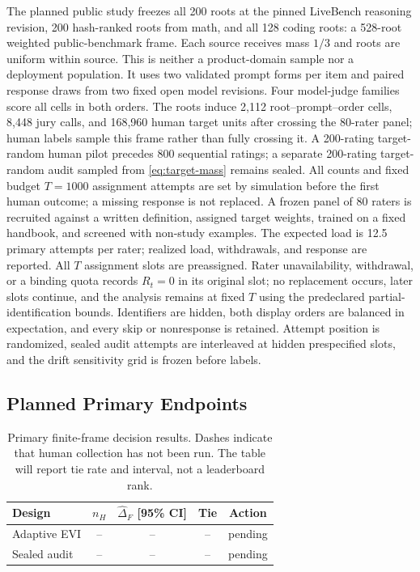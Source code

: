 \documentclass{article}
\begin{document}
The planned public study freezes all 200 roots at the pinned LiveBench
reasoning revision, 200 hash-ranked roots from math, and all 128 coding roots:
a 528-root weighted public-benchmark frame. Each source receives mass $1/3$
and roots are uniform within source. This is neither a product-domain sample
nor a deployment population. It uses two validated prompt forms per item and
paired response draws from two fixed open model revisions. Four model-judge families
score all cells in both orders. The roots induce 2,112
root--prompt--order cells, 8,448 jury calls, and 168,960 human target units
after crossing the 80-rater panel; human labels sample this frame rather than
fully crossing it. A 200-rating target-random human pilot precedes 800
sequential ratings; a separate 200-rating target-random audit sampled from
\cref{eq:target-mass} remains sealed. All counts and fixed budget $T=1000$
assignment attempts are set by simulation before the first human outcome; a
missing response is not replaced. A frozen panel of 80 raters
is recruited against a written definition, assigned
target weights, trained on a fixed handbook, and screened with non-study
examples. The expected load is 12.5 primary attempts per rater; realized load,
withdrawals, and response are reported. All $T$ assignment slots are
preassigned. Rater unavailability, withdrawal, or a binding quota records
$R_t=0$ in its original slot; no replacement occurs, later slots continue, and
the analysis remains at fixed $T$ using the predeclared partial-identification
bounds.
Identifiers are hidden, both display orders are balanced in expectation, and
every skip or nonresponse is retained. Attempt position is randomized, sealed
audit attempts are interleaved at hidden prespecified slots, and the drift
sensitivity grid is frozen before labels.

\subsection{Planned Primary Endpoints}

\begin{table}[H]
\caption{Primary finite-frame decision results. Dashes indicate that human
collection has not been run. The table will report tie rate and interval, not a
leaderboard rank.}
\label{tab:main}
\centering
\begin{small}
\setlength{\tabcolsep}{2.5pt}
\begin{tabular}{lcccc}
\toprule
Design & $n_H$ & $\widehat\Delta_F$ [95\% CI]
& Tie & Action \\
\midrule
Adaptive EVI & -- & -- & -- & pending \\
Sealed audit & -- & -- & -- & pending \\
\bottomrule
\end{tabular}
\end{small}
\end{table}
\end{document}
